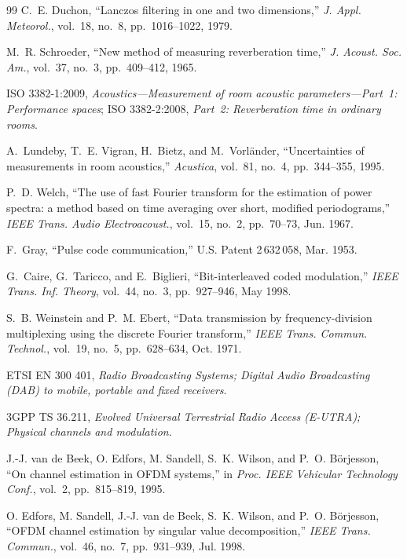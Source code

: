 \documentclass[11pt,a4paper]{article}
\theoremstyle{remark}
\begin{document}
\begin{thebibliography}{99}
C.~E. Duchon, ``Lanczos filtering in one and two dimensions,'' \emph{J. Appl. Meteorol.}, vol.~18, no.~8, pp.~1016--1022, 1979.

M.~R. Schroeder, ``New method of measuring reverberation time,'' \emph{J. Acoust. Soc. Am.}, vol.~37, no.~3, pp.~409--412, 1965.

ISO 3382-1:2009, \emph{Acoustics---Measurement of room acoustic parameters---Part~1: Performance spaces}; ISO 3382-2:2008, \emph{Part~2: Reverberation time in ordinary rooms}.

A.~Lundeby, T.~E. Vigran, H.~Bietz, and M.~Vorl\"ander, ``Uncertainties of measurements in room acoustics,'' \emph{Acustica}, vol.~81, no.~4, pp.~344--355, 1995.

P.~D. Welch, ``The use of fast Fourier transform for the estimation of power spectra: a method based on time averaging over short, modified periodograms,'' \emph{IEEE Trans. Audio Electroacoust.}, vol.~15, no.~2, pp.~70--73, Jun. 1967.

F.~Gray, ``Pulse code communication,'' U.S. Patent 2\,632\,058, Mar. 1953.

G.~Caire, G.~Taricco, and E.~Biglieri, ``Bit-interleaved coded modulation,'' \emph{IEEE Trans. Inf. Theory}, vol.~44, no.~3, pp.~927--946, May 1998.

S.~B. Weinstein and P.~M. Ebert, ``Data transmission by frequency-division multiplexing using the discrete Fourier transform,'' \emph{IEEE Trans. Commun. Technol.}, vol.~19, no.~5, pp.~628--634, Oct. 1971.

ETSI EN 300 401, \emph{Radio Broadcasting Systems; Digital Audio Broadcasting (DAB) to mobile, portable and fixed receivers}.

3GPP TS 36.211, \emph{Evolved Universal Terrestrial Radio Access (E-UTRA); Physical channels and modulation}.

J.-J. van de Beek, O. Edfors, M. Sandell, S.~K. Wilson, and P.~O. B\"orjesson, ``On channel estimation in OFDM systems,'' in \emph{Proc. IEEE Vehicular Technology Conf.}, vol.~2, pp.~815--819, 1995.

O. Edfors, M. Sandell, J.-J. van de Beek, S.~K. Wilson, and P.~O. B\"orjesson, ``OFDM channel estimation by singular value decomposition,'' \emph{IEEE Trans. Commun.}, vol.~46, no.~7, pp.~931--939, Jul. 1998.


\end{thebibliography}
\end{document}
